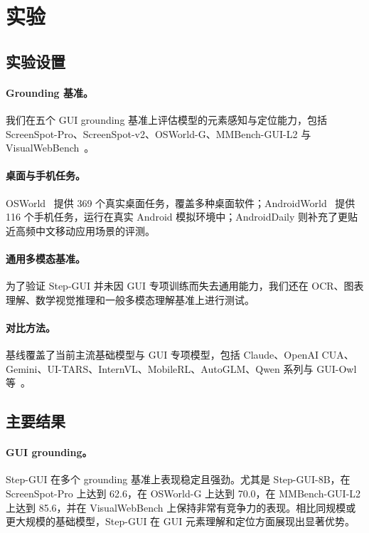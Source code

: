 \section{实验}

\subsection{实验设置}

\paragraph{Grounding 基准。}
我们在五个 GUI grounding 基准上评估模型的元素感知与定位能力，包括 ScreenSpot-Pro、ScreenSpot-v2、OSWorld-G、MMBench-GUI-L2 与 VisualWebBench~\citep{li2025screenspotpro, wu2024atlas, wang2025mmbench, liu2024visualwebbench_vwb}。

\paragraph{桌面与手机任务。}
OSWorld~\citep{xie2024osworld} 提供 369 个真实桌面任务，覆盖多种桌面软件；AndroidWorld~\citep{rawles2024androidworld} 提供 116 个手机任务，运行在真实 Android 模拟环境中；AndroidDaily 则补充了更贴近高频中文移动应用场景的评测。

\paragraph{通用多模态基准。}
为了验证 Step-GUI 并未因 GUI 专项训练而失去通用能力，我们还在 OCR、图表理解、数学视觉推理和一般多模态理解基准上进行测试。

\paragraph{对比方法。}
基线覆盖了当前主流基础模型与 GUI 专项模型，包括 Claude、OpenAI CUA、Gemini、UI-TARS、InternVL、MobileRL、AutoGLM、Qwen 系列与 GUI-Owl 等~\citep{claude4sonnet, claude45sonnet, openai_cua_o3, gemini2.5cu, qin2025ui_uitars1, wang2025ui_uitars2, wang2025internvl3, xu2025mobilerl, AutoGLM, glm4.6v, bai2025qwen2, ye2025mobile_mobileagentv3, Bai2025Qwen3VL}。

\subsection{主要结果}

\paragraph{GUI grounding。}
Step-GUI 在多个 grounding 基准上表现稳定且强劲。尤其是 Step-GUI-8B，在 ScreenSpot-Pro 上达到 62.6，在 OSWorld-G 上达到 70.0，在 MMBench-GUI-L2 上达到 85.6，并在 VisualWebBench 上保持非常有竞争力的表现。相比同规模或更大规模的基础模型，Step-GUI 在 GUI 元素理解和定位方面展现出显著优势。

